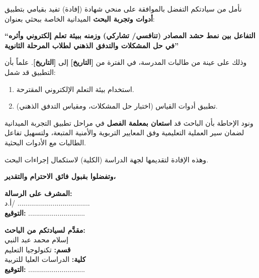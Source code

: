 \documentclass[12pt, a4paper]{extarticle}
\begin{document}
\vspace{0.3cm}

\noindent نأمل من سيادتكم التفضل بالموافقة على منحي شهادة (إفادة) تفيد بقيامي بتطبيق \textbf{أدوات وتجربة البحث} الميدانية الخاصة ببحثي بعنوان:

\vspace{0.2cm}
\begin{center}
    \textbf{``التفاعل بين نمط حشد المصادر (تنافسي/ تشاركي) وزمنه ببيئة تعلم إلكتروني وأثره في حل المشكلات والتدفق الذهني لطلاب المرحلة الثانوية''}
\end{center}
\vspace{0.2cm}

\noindent وذلك على عينة من طالبات المدرسة، في الفترة من \textbf{[التاريخ]} إلى \textbf{[التاريخ]}. علماً بأن التطبيق قد شمل:

\begin{enumerate}[nosep, topsep=2pt]
    \item استخدام بيئة التعلم الإلكتروني المقترحة.
    \item تطبيق أدوات القياس (اختبار حل المشكلات، ومقياس التدفق الذهني).
\end{enumerate}

\noindent ونود الإحاطة بأن الباحث قد \textbf{استعان بمعلمة الفصل} في مراحل تطبيق التجربة الميدانية لضمان سير العملية التعليمية وفق المعايير التربوية والأمنية المتبعة، ولتسهيل تفاعل الطالبات مع الأدوات البحثية.

\vspace{0.2cm}
\noindent وهذه الإفادة لتقديمها لجهة الدراسة (الكلية) لاستكمال إجراءات البحث.

\vspace{0.3cm}
\begin{center}
    \textbf{وتفضلوا بقبول فائق الاحترام والتقدير،}
\end{center}

\vspace{0.4cm}

\noindent
\begin{minipage}[t]{0.45\textwidth}
    \textbf{المشرف على الرسالة:}\\[0.2cm]
    أ.د/ .....................................\\[0.2cm]
    \textbf{التوقيع:} .............................
\end{minipage}
\hfill
\begin{minipage}[t]{0.48\textwidth}
    \textbf{مقدَّم لسيادتكم من الباحث:}\\[0.2cm]
    إسلام محمد عبد النبي\\[0.2cm]
    \textbf{قسم:} تكنولوجيا التعليم\\[0.2cm]
    \textbf{كلية:} الدراسات العليا للتربية\\[0.2cm]
    \textbf{التوقيع:} .............................
\end{minipage}
\end{document}
